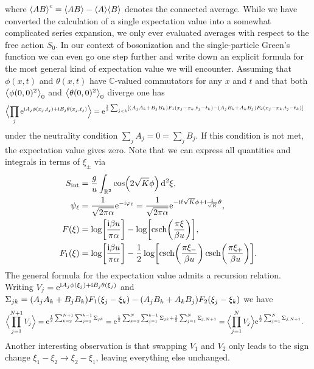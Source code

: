 \documentclass[english, parskip=full]{scrartcl}
\begin{document}
where $\bra*{AB}^c = \bra*{AB} - \bra*{A}\bra*{B}$ denotes the connected average.
While we have converted the calculation of a single expectation value into a somewhat complicated series expansion, we only ever evaluated averages with respect to the free action $S_0$.
In our context of bosonization and the single-particle Green's function we can even go one step further and write down an explicit formula for the most general kind of expectation value we will encounter.
Assuming that $\phi(x,t)$ and $\theta(x,t)$ have $\mathbb{C}$-valued commutators for any $x$ and $t$ and that both $\bra*{\phi(0,0)^2}_0$ and $\bra*{\theta(0,0)^2}_0$ diverge one has
\begin{align}
\bra[\Big]{\prod_j \powe{\i A_j\phi(x_j,t_j) + \i B_j\theta(x_j,t_j)}} &= \powe{\frac{1}{2} \sum_{j<k} \klb*{\kla*{A_jA_k + B_jB_k} F_1(x_j-x_k,t_j-t_k) - \kla*{A_jB_k + A_kB_j} F_2(x_j-x_k,t_j-t_k)}}
\end{align}
under the neutrality condition $\sum_jA_j=0=\sum_jB_j$.
If this condition is not met, the expectation value gives zero.
Note that we can express all quantities and integrals in terms of $\xi_\pm$ via
\begin{align}
S_\Text{int} &= \frac{g}{u}\intrnd{2}{\cos\kla*{2\sqrt{K}\phi}}{\xi},\\
\psi_\ell &= \frac{1}{\sqrt{2\pi\alpha}} \powe{-\i\varphi_\ell} = \frac{1}{\sqrt{2\pi\alpha}} \powe{-\i \ell \sqrt{K} \phi + \i\frac{1}{\sqrt{K}} \theta},\\
F(\xi) &= \log\klb*{\frac{\i\beta u}{\pi\alpha}} - \log\klb*{\csch\kla*{\frac{\pi \xi}{\beta u}}},\\
F_1(\xi) &= \log\klb*{
\frac{\i\beta u}{\pi\alpha}} - \frac{1}{2}\log\klb*{ \csch\kla*{\frac{\pi \xi_-}{\beta u}} \csch\kla*{\frac{\pi \xi_+}{\beta u}}}.
\end{align}
The general formula for the expectation value admits a recursion relation.
Writing $V_j = \powe{\i A_j\phi(\xi_j) + \i B_j \theta(\xi_j)}$ and $\Sigma_{jk} = \kla*{A_jA_k + B_jB_k}F_1(\xi_j-\xi_k) - \kla*{A_jB_k + A_kB_j}F_2(\xi_j-\xi_k)$ we have
\begin{align}
\bra[\Big]{\prod_{j=1}^{N+1} V_j } &= \powe{\frac{1}{2} \sum_{k=2}^{N+1} \sum_{j=1}^{k-1} \Sigma_{jk}} = \powe{\frac{1}{2} \sum_{k=2}^N \sum_{j=1}^{k-1} \Sigma_{jk} + \frac{1}{2}\sum_{j=1}^N \Sigma_{j,N+1} } = \bra[\Big]{\prod_{j=1}^NV_j} \powe{\frac{1}{2} \sum_{j=1}^N \Sigma_{j,N+1}}.
\end{align}
Another interesting observation is that swapping $V_1$ and $V_2$ only leads to the sign change $\xi_1 - \xi_2 \rightarrow \xi_2 - \xi_1$, leaving everything else unchanged.
\end{document}
